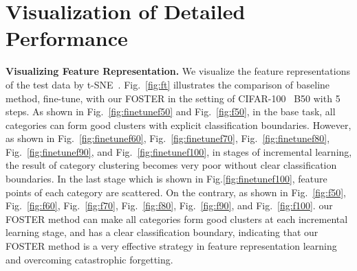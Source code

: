 \documentclass[runningheads]{llncs}
\begin{document}
\section{Visualization of Detailed Performance}\label{sec:4}
\noindent \textbf{Visualizing Feature Representation.}
We visualize the feature representations of the test data by t-SNE~\cite{van2008visualizing}. Fig.~\ref{fig:ft} illustrates  the comparison of baseline method, fine-tune, with our FOSTER in the setting of CIFAR-100~\cite{cifar100} B50 with 5 steps. As shown in Fig.~\ref{fig:finetunef50} and Fig.~\ref{fig:f50}, in the base task, all categories can form good clusters with explicit classification boundaries. However, as shown in Fig.~\ref{fig:finetunef60}, Fig.~\ref{fig:finetunef70}, Fig.~\ref{fig:finetunef80}, Fig.~\ref{fig:finetunef90}, and Fig.~\ref{fig:finetunef100}, in stages of incremental learning, the result of category clustering becomes very poor without clear classification boundaries. In the last stage which is shown in Fig.\ref{fig:finetunef100}, feature points of each category are scattered. On the contrary, as shown in Fig.~\ref{fig:f50}, Fig.~\ref{fig:f60}, Fig.~\ref{fig:f70}, Fig.~\ref{fig:f80}, Fig.~\ref{fig:f90}, and Fig.~\ref{fig:f100}. our FOSTER method can make all categories form good clusters at each incremental learning stage, and has a clear classification boundary, indicating that our FOSTER method is a very effective strategy in feature representation learning and overcoming catastrophic forgetting.
\end{document}
